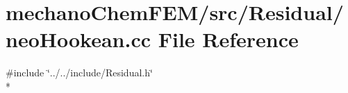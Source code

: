 \section{mechano\-Chem\-F\-E\-M/src/\-Residual/neo\-Hookean.cc File Reference}
\label{neo_hookean_8cc}
{\ttfamily \#include \char`\"{}../../include/\-Residual.\-h\char`\"{}}\\*
